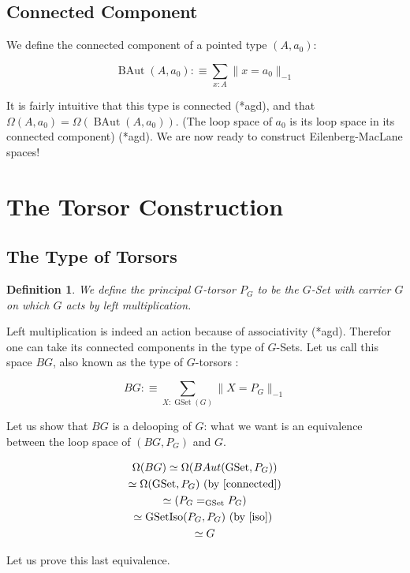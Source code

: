 \documentclass{article}
\DeclareMathOperator{\gset}{GSet}
\DeclareMathOperator{\gsetiso}{GSetIso}
\DeclareMathOperator{\baut}{BAut}
\newtheorem{definition}{Definition}[section]
\begin{document}
\subsection{Connected Component} \label{connected}

We define the connected component of a pointed type $(A,a_0)$:

\[\baut(A,a_0) :\equiv \sum_{x : A} \| x = a_0 \|_{-1}\]

It is fairly intuitive that this type is connected (*agd), and that $\Omega(A,a_0) = \Omega(\baut(A,a_0))$. (The loop space of $a_0$ is its loop space in its connected component) (*agd). We are now ready to construct Eilenberg-MacLane spaces!

\section{The Torsor Construction}

\subsection{The Type of Torsors}

\begin{definition}
  We define the \emph{principal $G$-torsor} $P_{G}$ to be the $G$-Set with carrier $G$ on which $G$ acts by left multiplication.
\end{definition}

Left multiplication is indeed an action because of associativity (*agd). Therefor one can take its connected components in the type of $G$-Sets. Let us call this space $BG$, also known as the type of $G$-torsors :

\[BG :\equiv \sum_{X : \gset(G)}\| X = P_{G} \|_{-1} \]

Let us show that $BG$ is a delooping of $G$: what we want is an equivalence between the loop space of $(BG, P_{G})$ and $G$.

\begin{gather*}
  \Omega(BG) \simeq \Omega(BAut(\gset, P_{G})) \\
             \simeq \Omega(\gset, P_{G}) \text{ (by \ref{connected})}\\
             \simeq (P_{G} =_{\gset} P_{G}) \\
             \simeq \gsetiso(P_{G}, P_{G}) \text{ (by \ref{iso}) }\\
             \simeq G
\end{gather*}

Let us prove this last equivalence.
\end{document}

